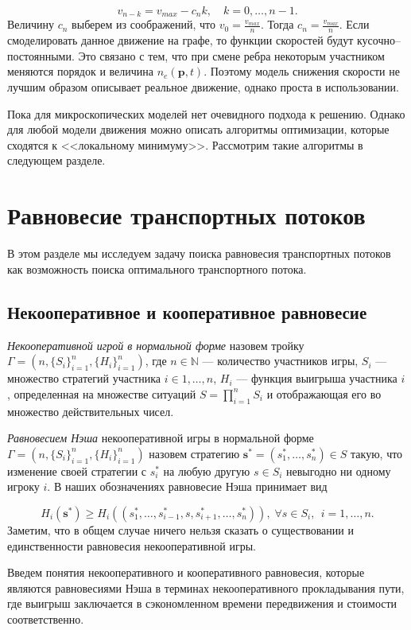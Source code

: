 \documentclass[12pt, a4paper]{article}
\begin{document}
$$v_{n - k} = v_{max} - c_n k, \quad k = 0, \dots, n - 1.$$
Величину $c_n$ выберем из соображений, что $v_0 = \frac{v_{max}}{n}$. Тогда $c_n = \frac{v_{max}}{n}$. Если смоделировать данное движение на графе, то функции скоростей будут кусочно--постоянными. Это связано с тем, что при смене ребра некоторым участником меняются порядок и величина $n_e(\textbf{p}, t)$. Поэтому модель снижения скорости не лучшим образом описывает реальное движение, однако проста в использовании.

Пока для микроскопических моделей нет очевидного подхода к решению. Однако для любой модели движения можно описать алгоритмы оптимизации, которые сходятся к <<локальному минимуму>>. Рассмотрим такие алгоритмы в следующем разделе.

\newpage
\section{Равновесие транспортных потоков}
\label{sec:rovn}
В этом разделе мы исследуем задачу поиска равновесия транспортных потоков как возможность поиска оптимального транспортного потока.

\subsection{Некооперативное и кооперативное равновесие}

\textit{Некооперативной игрой в нормальной форме} назовем тройку $\Gamma = (n, \{S_i\}_{i = 1}^n, \{H_i\}_{i = 1}^n)$, где $n \in \mathbb{N}$ --- количество участников игры, $S_i$ --- множество стратегий участника $i \in {1, \dots, n}$, $H_i$ --- функция выигрыша участника $i$, определенная на множестве ситуаций $S = \prod\limits_{i = 1}^n S_i$ и отображающая его во множество действительных чисел.

\textit{Равновесием Нэша} некооперативной игры в нормальной форме $\Gamma = (n, \{S_i\}_{i = 1}^n, \{H_i\}_{i = 1}^n)$ назовем стратегию $\textbf{s}^* = (s^*_1,\dots, s^*_n) \in S$ такую, что изменение своей стратегии с $s_i^*$ на любую другую $s \in S_i$ невыгодно ни одному игроку $i$. В наших обозначениях равновесие Нэша принимает вид

$$H_i(\textbf{s}^*) \ge H_i(\left(s^*_1, \ldots, s^*_{i - 1}, s, s^*_{i + 1}, \ldots, s^*_{n} \right)), \; \forall s \in S_i, \; \, i = 1, \dots, n. $$ 
Заметим, что в общем случае ничего нельзя сказать о существовании и единственности равновесия некооперативной игры.

Введем понятия некооперативного и кооперативного равновесия, которые являются равновесиями Нэша в терминах некооперативного прокладывания пути, где выигрыш заключается в сэкономленном времени передвижения и стоимости соответственно.
\end{document}
